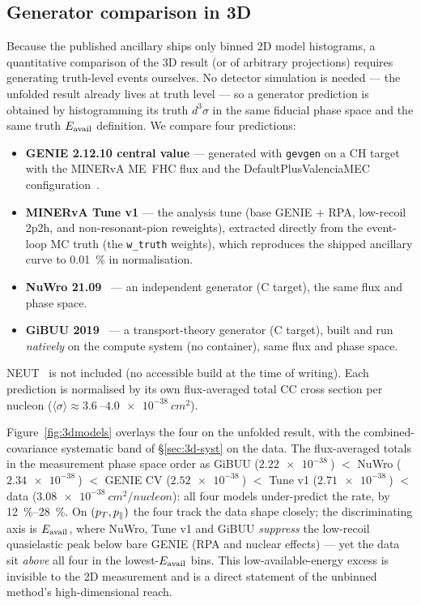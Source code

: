 \subsection{Generator comparison in 3D}
\label{sec:3d-models}
Because the published ancillary ships only binned 2D model histograms, a
quantitative comparison of the 3D result (or of arbitrary projections) requires
generating truth-level events ourselves. No detector simulation is needed --- the
unfolded result already lives at truth level --- so a generator prediction is
obtained by histogramming its truth $d^{3}\sigma$ in the same fiducial phase
space and the same truth $E_{\mathrm{avail}}$ definition. We compare four predictions:
\begin{itemize}
  \item \textbf{GENIE 2.12.10 central value} --- generated with \texttt{gevgen}
        on a CH target with the MINERvA ME~FHC flux and the
        DefaultPlusValenciaMEC configuration~\cite{Andreopoulos:2009rq}.
  \item \textbf{MINERvA Tune v1} --- the analysis tune (base GENIE $+$ RPA,
        low-recoil 2p2h, and non-resonant-pion reweights), extracted directly
        from the event-loop MC truth (the \texttt{w\_truth} weights), which
        reproduces the shipped ancillary curve to \SI{0.01}{\percent} in
        normalisation.
  \item \textbf{NuWro 21.09}~\cite{Golan:2012wx} --- an independent generator
        (C target), the same flux and phase space.
  \item \textbf{GiBUU 2019}~\cite{Buss:2011mx} --- a transport-theory generator
        (C target), built and run \emph{natively} on the compute system (no
        container), same flux and phase space.
\end{itemize}
NEUT~\cite{Hayato:2009zz} is not included (no accessible build at the time of
writing). Each prediction is normalised by its own flux-averaged total CC cross
section per nucleon ($\langle\sigma\rangle\approx\SI{3.6}{}$--$\SI{4.0e-38}{cm^2}$).

Figure~\ref{fig:3dmodels} overlays the four on the unfolded result, with the
combined-covariance systematic band of \S\ref{sec:3d-syst} on the data. The
flux-averaged totals in the measurement phase space order as
GiBUU ($\SI{2.22e-38}{}$) $<$ NuWro ($\SI{2.34e-38}{}$) $<$ GENIE CV
($\SI{2.52e-38}{}$) $<$ Tune v1 ($\SI{2.71e-38}{}$) $<$ data
($\SI{3.08e-38}{cm^2/nucleon}$): all four models under-predict the rate, by
\SIrange{12}{28}{\percent}. On $(p_{T},p_{\parallel})$ the four track the data shape
closely; the discriminating axis is $E_{\mathrm{avail}}$, where NuWro, Tune v1 and GiBUU
\emph{suppress} the low-recoil quasielastic peak below bare GENIE (RPA and
nuclear effects) --- yet the data sit \emph{above} all four in the
lowest-$E_{\mathrm{avail}}$ bins. This low-available-energy excess is invisible to the 2D
measurement and is a direct statement of the unbinned method's high-dimensional
reach.

